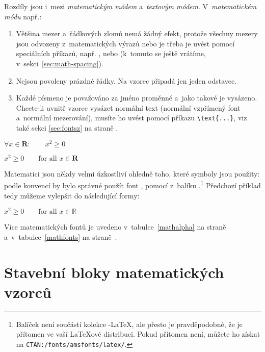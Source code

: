 Rozdíly jsou i~mezi \emph{matematickým módem}
a~\emph{textovým módem}. V~\emph{matematickém módu} např.:

\begin{enumerate}

\item {} Většina mezer a~řádkových zlomů nemá žádný
efekt, protože všechny mezery jsou odvozeny z~matematických výrazů nebo
je třeba je uvést pomocí speciálních příkazů, např. \ci{,}, 
nebo  (k~tomuto se ještě vrátíme, v~sekci~\ref{sec:math-spacing}).
 
\item Nejsou povoleny prázdné řádky. Na vzorec připadá jen jeden odstavec.

\item Každé písmeno je považováno za jméno proměnné a~jako takové
je vysázeno. Chcete-li uvnitř vzorce vysázet normální text (normální
vzpřímený font a~normální mezerování), musíte ho uvést pomocí příkazu
\verb|\text{...}|, viz také sekci \ref{sec:fontsz} na straně
\pageref{sec:fontsz}.

\end{enumerate}
\begin{example}
$\forall x \in \mathbf{R}:
 \qquad x^{2} \geq 0$
\end{example}
\begin{example}
$x^{2} \geq 0\qquad
 \text{for all }x\in\mathbf{R}$
\end{example}
 
Matematici jsou někdy velmi úzkostliví ohledně toho, které symboly
jsou použity: podle konvencí by bylo správné použít font
,  pomocí 
z~balíku .\footnote{Balíček  není součástí
kolekce \AmS-\LaTeX, ale přesto je pravděpodobné,
že je přítomen ve vaší \LaTeX ové distribuci. Pokud přítomen není,
můžete ho získat na \texttt{CTAN:/fonts/amsfonts/latex/}.
}
\ifx\mathbb\undefined\else
Předchozí příklad tedy můžeme vylepšit do následující formy:
\begin{example}
$x^{2} \geq 0\qquad
 \text{for all } x 
 \in \mathbb{R}$
\end{example}
\fi
Více matematických fontů je uvedeno v~tabulce~\ref{mathalpha} na
straně~\pageref{mathalpha} a~v~tabulce~\ref{mathfonts} na
straně~\pageref{mathfonts}.


\section{Stavební bloky matematických vzorců}

